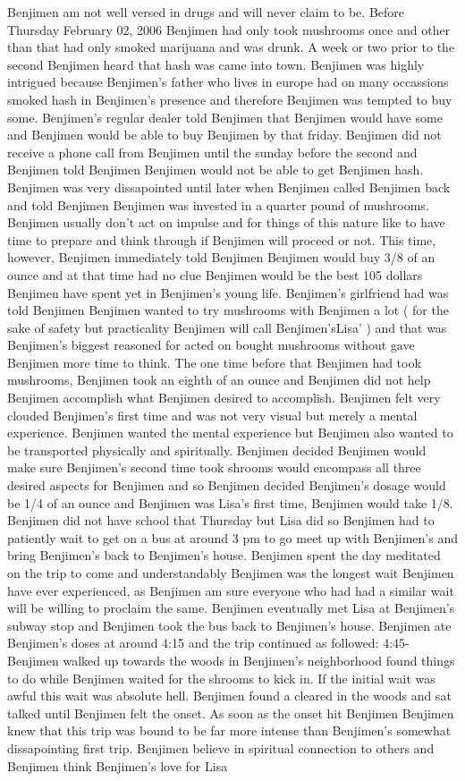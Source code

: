 \documentclass[12pt]{book}
\begin{document}
Benjimen am not well versed in drugs and will never claim to be. Before Thursday February 02, 2006 Benjimen had only took mushrooms once and other than that had only smoked marijuana and was drunk. A week or two prior to the second Benjimen heard that hash was came into town. Benjimen was highly intrigued because Benjimen's father who lives in europe had on many occassions smoked hash in Benjimen's presence and therefore Benjimen was tempted to buy some. Benjimen's regular dealer told Benjimen that Benjimen would have some and Benjimen would be able to buy Benjimen by that friday. Benjimen did not receive a phone call from Benjimen until the sunday before the second and Benjimen told Benjimen Benjimen would not be able to get Benjimen hash. Benjimen was very dissapointed until later when Benjimen called Benjimen back and told Benjimen Benjimen was invested in a quarter pound of mushrooms. Benjimen usually don't act on impulse and for things of this nature like to have time to prepare and think through if Benjimen will proceed or not. This time, however, Benjimen immediately told Benjimen Benjimen would buy 3/8 of an ounce and at that time had no clue Benjimen would be the best 105 dollars Benjimen have spent yet in Benjimen's young life. Benjimen's girlfriend had was told Benjimen Benjimen wanted to try mushrooms with Benjimen a lot ( for the sake of safety but practicality Benjimen will call Benjimen'sLisa' ) and that was Benjimen's biggest reasoned for acted on bought mushrooms without gave Benjimen more time to think. The one time before that Benjimen had took mushrooms, Benjimen took an eighth of an ounce and Benjimen did not help Benjimen accomplish what Benjimen desired to accomplish. Benjimen felt very clouded Benjimen's first time and was not very visual but merely a mental experience. Benjimen wanted the mental experience but Benjimen also wanted to be transported physically and spiritually. Benjimen decided Benjimen would make sure Benjimen's second time took shrooms would encompass all three desired aspects for Benjimen and so Benjimen decided Benjimen's dosage would be 1/4 of an ounce and Benjimen was Lisa's first time, Benjimen would take 1/8. Benjimen did not have school that Thursday but Lisa did so Benjimen had to patiently wait to get on a bus at around 3 pm to go meet up with Benjimen's and bring Benjimen's back to Benjimen's house. Benjimen spent the day meditated on the trip to come and understandably Benjimen was the longest wait Benjimen have ever experienced, as Benjimen am sure everyone who had had a similar wait will be willing to proclaim the same. Benjimen eventually met Lisa at Benjimen's subway stop and Benjimen took the bus back to Benjimen's house. Benjimen ate Benjimen's doses at around 4:15 and the trip continued as followed: 4:45- Benjimen walked up towards the woods in Benjimen's neighborhood found things to do while Benjimen waited for the shrooms to kick in. If the initial wait was awful this wait was absolute hell. Benjimen found a cleared in the woods and sat talked until Benjimen felt the onset. As soon as the onset hit Benjimen Benjimen knew that this trip was bound to be far more intense than Benjimen's somewhat dissapointing first trip. Benjimen believe in spiritual connection to others and Benjimen think Benjimen's love for Lisa 
\end{document}
